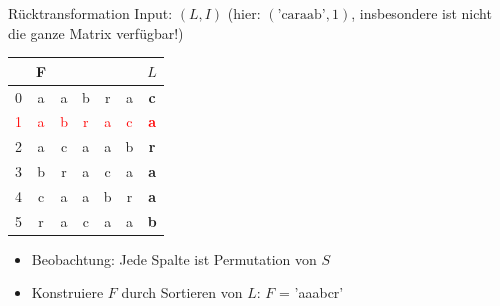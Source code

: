 \documentclass[ngerman,aspectratio=169,10pt]{beamer}
\newcommand{\red}[1]{\textcolor{red}{#1}}
\begin{document}
\begin{frame}{Rücktransformation}
    Input: $(L, I)$ (hier: $(\text{'caraab'}, 1)$, insbesondere ist nicht die ganze Matrix verfügbar!)\\[5px]
    \begin{tabular}{l|c c c c c c}
        &F&&&&&$L$\\ \hline
        0&a\vline&a&b&r&a&\textbf{c}\\
        \red{1}&\red{a}&\red{b}&\red{r}&\red{a}&\red{c}&\red{\textbf{a}}\vline\\
        2&a&c&a\vline&a&b&\textbf{r}\\
        3&b&r&a&c&a\vline&\textbf{a}\\
        4&c&a\vline&a&b&r&\textbf{a}\\
        5&r&a&c&a\vline&a&\textbf{b}\\
    \end{tabular}
    \begin{itemize}
        \item Beobachtung: Jede Spalte ist Permutation von $S$
        \item Konstruiere $F$ durch Sortieren von $L$: $F$ = 'aaabcr'
    \end{itemize}
\end{frame}
\end{document}

